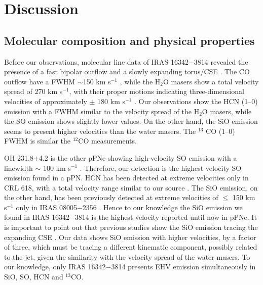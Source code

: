 \documentclass[a4paper,fleqn,usenatbib]{mnras}
\begin{document}
\section{Discussion}
\subsection{Molecular composition and physical properties}
Before our observations, molecular line data of IRAS 16342$-$3814 revealed the presence of a fast bipolar outflow and a slowly expanding torus/CSE \citep{Imai12}. The CO outflow have a FWHM $\sim$150 km s$^{-1}$ \citep{Imai09}, while the H$_2$O masers show a total velocity spread of 270 km s$^{-1}$, with their proper motions indicating three-dimensional velocities of approximately $\pm$ 180 km s$^{-1}$ \citep{Claussen09}. Our observations show the HCN (1--0) emission with a FWHM similar to the velocity spread of the H$_2$O masers, while the SO emission shows slightly lower values. On the other hand, the SiO emission seems to present higher velocities than the water masers. The $^{13}$ CO (1--0) FWHM is similar the $^{12}$CO measurements.

OH 231.8$+$4.2 is the other pPNe showing high-velocity SO emission with a linewidth $\sim$ 100 km s$^{-1}$ \citep[with a notably asymmetric profile:][]{Claude2000}. Therefore, our detection is the highest velocity SO emission found in a pPN. HCN has been detected at extreme velocities only in CRL 618, with a total velocity range similar to our source \citep[$\sim$250 km s$^{-1}$][]{Sanchez04}. The SiO emission, on the other hand, has been previously detected at extreme velocities of $\leq$ 150 km s$^{-1}$ only in IRAS 08005$-$2356 \citep[albeit in the weak SiO (5--4) and SiO (6--5):][]{Sahai15}. Hence to our knowledge the SiO emission we found in IRAS 16342$-$3814 is the highest velocity reported until now in pPNe. It is important to point out that previous studies show the SiO emission tracing the expanding CSE \citep[see][for a recent study of the SiO emission in evolved stars]{Vicente16}. Our data shows SiO emission with higher velocities, by a factor of three, which must be tracing a different kinematic component, possibly related to the jet, given the similarity with the velocity spread of the water masers. To our knowledge, only IRAS 16342$-$3814 presents EHV emission simultaneously in SiO, SO, HCN and $^{13}$CO.
\end{document}
